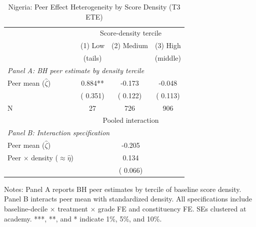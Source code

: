 \begin{table}[!htbp]
\centering
\caption{Nigeria: Peer Effect Heterogeneity by Score Density (T3 ETE)}
\label{tab:ng_density_decomp}
\begin{threeparttable}
\begin{tabular}[t]{lccc}
\toprule
 & \multicolumn{3}{c}{Score-density tercile} \\
\cmidrule(l{3pt}r{3pt}){2-4}
 & (1) Low & (2) Medium & (3) High \\
 & (tails) & & (middle) \\
\midrule
\multicolumn{4}{l}{\textit{Panel A: BH peer estimate by density tercile}} \\
Peer mean ($\hat{\zeta}$) &   0.884** &  -0.173 &  -0.048 \\
 & (  0.351) & (  0.122) & (  0.113) \\
N & 27 & 726 & 906 \\
\addlinespace
\midrule
 & \multicolumn{3}{c}{Pooled interaction} \\
\cmidrule(l{3pt}r{3pt}){2-4}
\multicolumn{4}{l}{\textit{Panel B: Interaction specification}} \\
Peer mean ($\hat{\zeta}$) & \multicolumn{3}{c}{ -0.205} \\
Peer $\times$ density ($\approx \hat{\eta}$) & \multicolumn{3}{c}{  0.134} \\
 & \multicolumn{3}{c}{(  0.066)} \\
\bottomrule
\end{tabular}
\begin{tablenotes}[para]
\item Notes: Panel A reports BH peer estimates by tercile of baseline score density. Panel B interacts peer mean with standardized density. All specifications include baseline-decile $\times$ treatment $\times$ grade FE and constituency FE. SEs clustered at academy. ***, **, and * indicate 1\%, 5\%, and 10\%.
\end{tablenotes}
\end{threeparttable}
\end{table}
